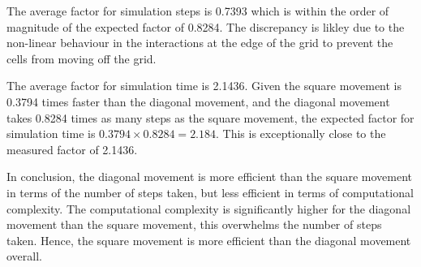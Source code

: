 The average factor for simulation steps is 0.7393 which is within the order of magnitude of the expected factor of 0.8284.
The discrepancy is likley due to the non-linear behaviour in the interactions at the edge of the grid to prevent the cells from moving off the grid.

The average factor for simulation time is 2.1436.
Given the square movement is 0.3794 times faster than the diagonal movement,
and the diagonal movement takes 0.8284 times as many steps as the square movement,
the expected factor for simulation time is $0.3794 \times 0.8284 = 2.184$.
This is exceptionally close to the measured factor of 2.1436.


In conclusion, the diagonal movement is more efficient than the square movement in terms of the number of steps taken, but less efficient in terms of computational complexity. The computational complexity is significantly higher for the diagonal movement than the square movement, this overwhelms the number of steps taken. Hence, the square movement is more efficient than the diagonal movement overall.

\clearpage